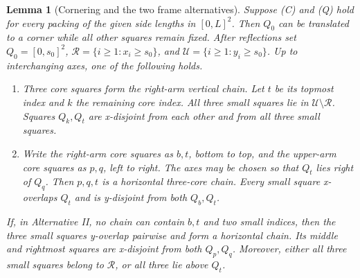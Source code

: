 \documentclass[12pt]{amsart}
\newtheorem{lemma}[theorem]{Lemma}
\theoremstyle{definition}
\theoremstyle{remark}
\numberwithin{equation}{section}
\numberwithin{figure}{section}
\numberwithin{table}{section}
\begin{document}
\begin{lemma}[Cornering and the two frame alternatives]\label{lem:fourcore-frame}
Suppose (C) and (Q) hold for every packing of the given side lengths in
$[0,L]^2$. Then $Q_0$ can be translated to a corner while all other squares
remain fixed. After reflections set $Q_0=[0,s_0]^2$,
$\mathcal R=\{i\ge1:x_i\ge s_0\}$, and
$\mathcal U=\{i\ge1:y_i\ge s_0\}$. Up to interchanging axes, one of
the following holds.

\begin{enumerate}[label=\textup{\Roman*.},ref=\Roman*]
\item Three core squares form the right-arm vertical chain. Let \(t\) be its
topmost index and \(k\) the remaining core index. All three small squares
lie in \(\mathcal U\setminus\mathcal R\). Squares \(Q_k,Q_t\) are x-disjoint
from each other and from all three small squares.
\item Write the right-arm core squares as \(b,t\), bottom to top, and the
upper-arm core squares as \(p,q\), left to right. The axes may be chosen
so that \(Q_t\) lies right of \(Q_q\). Then \(p,q,t\) is a horizontal
three-core chain. Every small square x-overlaps \(Q_t\) and is
y-disjoint from both \(Q_b,Q_t\).
\end{enumerate}
If, in Alternative II, no chain can contain \(b,t\) and two small
indices, then the three small squares y-overlap pairwise and form
a horizontal chain. Its middle and rightmost squares are x-disjoint from
both \(Q_p,Q_q\). Moreover, either all three small squares belong
to \(\mathcal R\), or all three lie above \(Q_t\).
\end{lemma}
\end{document}
